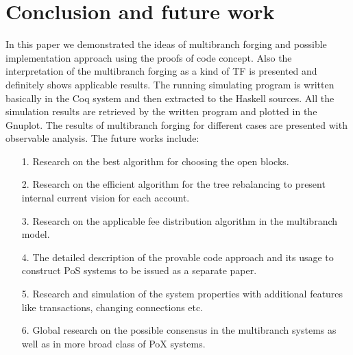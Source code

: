 \documentclass[12pt]{article}
\begin{document}
\section{Conclusion and future work}
In this paper we demonstrated the ideas of multibranch forging and possible implementation approach using the proofs of code concept. 
Also the interpretation of the multibranch forging as a kind of TF is presented and definitely shows applicable results. The running simulating 
program is written basically in the Coq system and then extracted to the Haskell sources. All the simulation results are retrieved 
by the written program and plotted in the Gnuplot. The results of multibranch forging for different cases are presented with observable analysis. 
The future works include:
\begin{itemize}
\item[1.] {Research on the best algorithm for choosing the open blocks.}
\item[2.] {Research on the efficient algorithm for the tree rebalancing to present internal current vision for each account.}
\item[3.] {Research on the applicable fee distribution algorithm in the multibranch model.}
\item[4.] {The detailed description of the provable code approach and its usage to construct PoS systems to be issued as a separate paper.}
\item[5.] {Research and simulation of the system properties with additional features like transactions, changing connections etc.}
\item[6.] {Global research on the possible consensus in the multibranch systems as well as in more broad class of PoX systems.}
\end{itemize}     
\end{document}
